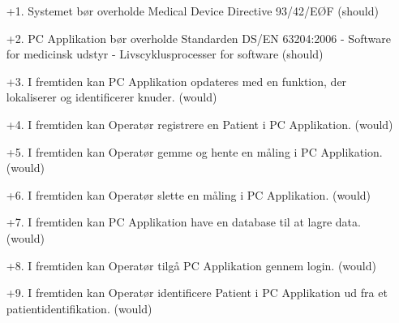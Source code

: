 \begin{enumerate}
	\item[+1.] Systemet bør overholde Medical Device Directive 93/42/EØF \cite{MDD} (should)
	\item[+2.] PC Applikation bør overholde Standarden DS/EN 63204:2006 - Software for medicinsk udstyr - Livscyklusprocesser for software \cite{software} (should)
    \item[+3.] I fremtiden kan PC Applikation opdateres med en funktion, der lokaliserer og identificerer knuder. (would)
    \item[+4.] I fremtiden kan Operatør registrere en Patient i PC Applikation. (would) 
    \item[+5.] I fremtiden kan Operatør gemme og hente en måling i PC Applikation. (would)  
    \item[+6.] I fremtiden kan Operatør slette en måling i PC Applikation. (would)
    \item[+7.] I fremtiden kan PC Applikation have en database til at lagre data. (would)
    \item[+8.] I fremtiden kan Operatør tilgå PC Applikation gennem login. (would) 
    \item[+9.] I fremtiden kan Operatør identificere Patient i PC Applikation ud fra et patientidentifikation. (would)
\end{enumerate}
